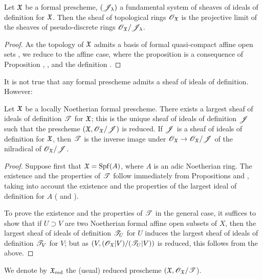 \begin{prop}[10.5.3]
\label{1.10.5.3}
Let $\mathfrak{X}$ be a formal prescheme, $(\mathscr{J}_\lambda)$ a fundamental system of sheaves of ideals of definition for $\mathfrak{X}$.
Then the sheaf of topological rings $\mathscr{O}_\mathfrak{X}$ is the projective limit of the sheaves of pseudo-discrete rings  $\mathscr{O}_\mathfrak{X}/\mathscr{J}_\lambda$.
\end{prop}

\begin{proof}
\label{proof-1.10.5.3}
As the topology of $\mathfrak{X}$ admits a basis of formal quasi-compact affine open sets , we reduce to the affine case, where the proposition is a consequence of Proposition , , and the definition .
\end{proof}

It is not true that any formal prescheme admits a sheaf of ideals of definition.
However:
\begin{prop}[10.5.4]
\label{1.10.5.4}
Let $\mathfrak{X}$ be a locally Noetherian formal prescheme.
There exists a largest sheaf of ideals of definition $\mathscr{T}$ for $\mathfrak{X}$; this is the unique sheaf of ideals of definition $\mathscr{J}$ such that the prescheme $(\mathfrak{X},\mathscr{O}_\mathfrak{X}/\mathscr{J})$ is reduced.
If $\mathscr{J}$ is a sheaf of ideals of definition for $\mathfrak{X}$, then $\mathscr{T}$ is the inverse image under $\OO_\fk{X}\to\OO_\fk{X}/\sh{J}$ of the nilradical of $\mathscr{O}_\mathfrak{X}/\mathscr{J}$.
\end{prop}

\begin{proof}
\label{proof-1.10.5.4}
Suppose first that $\mathfrak{X}={\mathop{\mathrm{Spf}}\nolimits}(A)$, where $A$ is an adic Noetherian ring.
The existence and the properties of $\mathscr{T}$ follow immediately from Propositions  and , taking into account the existence and the properties of the largest ideal of definition for $A$ ( and ).

To prove the existence and the properties of $\mathscr{T}$ in the general case, it suffices to show that if $U\supset V$ are two Noetherian formal affine open subsets of $X$, then the largest sheaf of ideals of definition $\mathscr{T}_U$ for $U$ induces the largest sheaf of ideals of definition $\mathscr{T}_V$ for $V$; but as $(V,(\mathscr{O}_\mathfrak{X}|V)/(\mathscr{T}_U|V))$ is reduced, this follows from the above.
\end{proof}

We denote by $\mathfrak{X}_\text{red}$ the (usual) reduced prescheme $(\mathfrak{X},\mathscr{O}_\mathfrak{X}/\mathscr{T}$).

